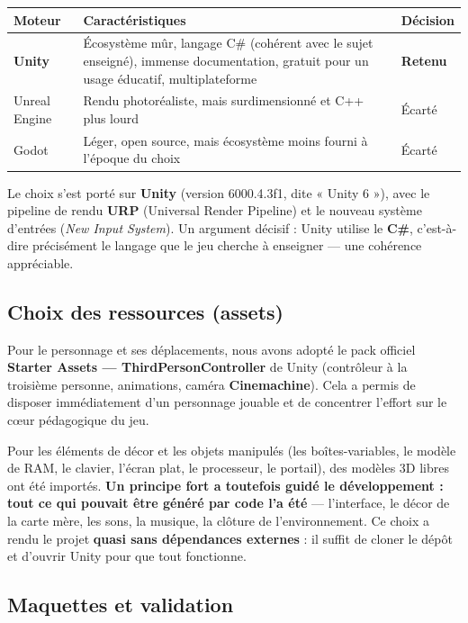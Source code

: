 \documentclass[12pt,a4paper]{article}
\begin{document}
\begin{center}
\renewcommand{\arraystretch}{1.3}
\begin{tabularx}{\linewidth}{@{}l X l@{}}
\toprule
\textbf{Moteur} & \textbf{Caractéristiques} & \textbf{Décision} \\
\midrule
\textbf{Unity} & Écosystème mûr, langage C\# (cohérent avec le sujet enseigné),
immense documentation, gratuit pour un usage éducatif, multiplateforme &
\textbf{Retenu} \\
Unreal Engine & Rendu photoréaliste, mais surdimensionné et C++ plus lourd &
Écarté \\
Godot & Léger, open source, mais écosystème moins fourni à l'époque du choix &
Écarté \\
\bottomrule
\end{tabularx}
\end{center}

Le choix s'est porté sur \textbf{Unity} (version 6000.4.3f1, dite « Unity 6 »),
avec le pipeline de rendu \textbf{URP} (Universal Render Pipeline) et le nouveau
système d'entrées (\emph{New Input System}). Un argument décisif : Unity utilise
le \textbf{C\#}, c'est-à-dire précisément le langage que le jeu cherche à
enseigner — une cohérence appréciable.

\subsection{Choix des ressources (assets)}

Pour le personnage et ses déplacements, nous avons adopté le pack officiel
\textbf{Starter Assets — ThirdPersonController} de Unity (contrôleur à la
troisième personne, animations, caméra \textbf{Cinemachine}). Cela a permis de
disposer immédiatement d'un personnage jouable et de concentrer l'effort sur le
cœur pédagogique du jeu.

Pour les éléments de décor et les objets manipulés (les boîtes-variables, le
modèle de RAM, le clavier, l'écran plat, le processeur, le portail), des modèles
3D libres ont été importés. \textbf{Un principe fort a toutefois guidé le
développement : tout ce qui pouvait être généré par code l'a été} — l'interface,
le décor de la carte mère, les sons, la musique, la clôture de l'environnement.
Ce choix a rendu le projet \textbf{quasi sans dépendances externes} : il suffit
de cloner le dépôt et d'ouvrir Unity pour que tout fonctionne.

\subsection{Maquettes et validation}
\end{document}
